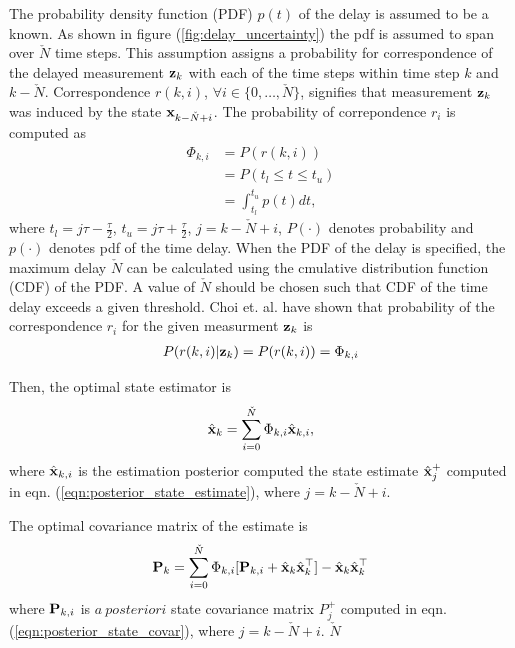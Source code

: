 The probability density function (PDF) $p(t)$ of the delay is assumed to be a known. As shown in figure (\ref{fig:delay_uncertainty}) the pdf is assumed to span over $\check{N}$ time steps. This assumption assigns a probability for correspondence of the delayed measurement $\mathbf{z}_k$ with each of the time steps within time step $k$ and $k- \check{N}$.
Correspondence $r(k,i)$, $\forall i \in \{0, \dots, \check{N}\}$, signifies that measurement $\mathbf{z}_k$ was induced by the state $\mathbf{x}_{k-\check{N}+i}$.
The probability of correpondence $r_i$ is computed as
\begin{align}
	\Phi_{k,i} &= P(r(k,i)) \\
	&= P(t_l \le t \le t_u) \\
	&= \int_{t_l}^{ t_u} p(t) dt,
\end{align}
where $t_l = {j\tau - \frac{\tau}{2}}$, $t_u = {j \tau + \frac{\tau}{2}}$, $j = k - \check{N} + i $, $P(\cdot)$ denotes probability and $p(\cdot)$ denotes pdf of the time delay. When the PDF of the delay is specified, the maximum delay $\check{N}$ can be calculated using the cmulative distribution function (CDF) of the PDF. 
A value of $\check{N}$ should be chosen such that CDF of the time delay exceeds a given threshold. 
Choi et. al. have shown that probability of the correspondence $r_i$ for the given measurment $\mathbf{z}_k$ is \cite{choi2012state}
\begin{align}
	P(r(k,i) | \mathbf{z}_k ) = P(r(k,i)) = \Phi_{k,i}
\end{align}

Then, the optimal state estimator is
\begin{align}
	\hat{\mathbf{x}}_k = \sum_{i=0}^{\check{N}} \Phi_{k,i} \hat{\mathbf{x}}_{k,i},
\end{align}
where $\hat{\mathbf{x}}_{k,i}$ is the estimation posterior computed the state estimate $\hat{\mathbf{x}}_j^+$ computed in eqn. (\ref{eqn:posterior_state_estimate}), where $j = k - \check{N} + i$.

The optimal covariance matrix of the estimate is
\begin{align}
	\mathbf{P}_k = \sum_{i = 0}^{\check{N}} \Phi_{k,i} [\mathbf{P}_{k,i} + \hat{\mathbf{x}}_k \hat{\mathbf{x}}_k^\top] - \hat{\mathbf{x}}_k \hat{\mathbf{x}}_k^\top	
\end{align}
where $\mathbf{P}_{k,i}$ is $a~posteriori$ state covariance matrix $P_j^+$ computed in eqn. (\ref{eqn:posterior_state_covar}),  where $j = k - \check{N} + i$. $\check{N}$



